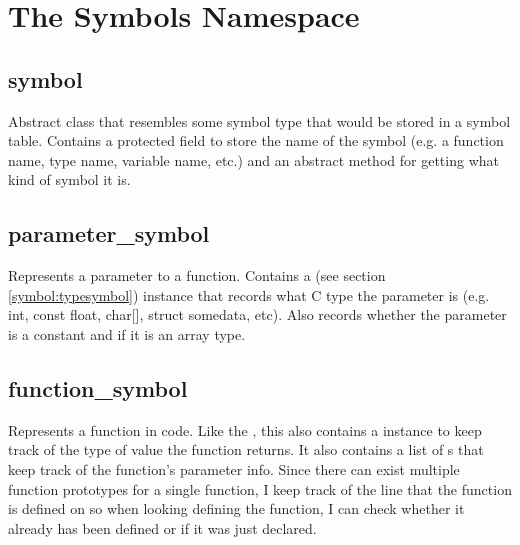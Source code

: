 \documentclass{article}
\begin{document}
\section{The Symbols Namespace}
\label{symbols:namespace}

\subsection{symbol}
\label{symbol:symbol}
Abstract class that resembles some symbol type that would be stored in a symbol table.
Contains a protected field to store the name of the symbol (e.g. a function name, type name, variable name, etc.) and an abstract method for getting what kind of symbol it is.

\subsection{parameter\_symbol}
\label{symbol:parametersymbol}
Represents a parameter to a function.
Contains a  (see section \ref{symbol:typesymbol}) instance that records what C type the parameter is (e.g. int, const float, char[], struct somedata, etc).
Also records whether the parameter is a constant and if it is an array type.

\subsection{function\_symbol}
\label{symbol:functionsymbol}
Represents a function in code.
Like the , this also contains a  instance to keep track of the type of value the function returns.
It also contains a list of s that keep track of the function's parameter info.
Since there can exist multiple function prototypes for a single function, I keep track of the line that the function is defined on so when looking defining the function, I can check whether it already has been defined or if it was just declared.
\end{document}
